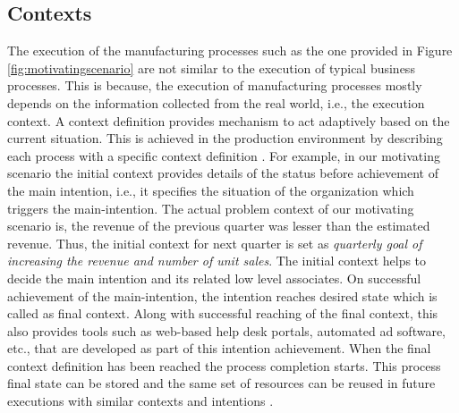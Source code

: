 \subsection{Contexts} 
\label{sec:contexts}
The execution of the manufacturing processes such as the one provided in Figure \ref{fig:motivatingscenario} are not similar to the execution of typical business processes. This is because, the execution of manufacturing processes mostly depends on the information collected from the real world, i.e., the execution context. A context definition provides mechanism to act adaptively based on the current situation. This is achieved in the production environment by describing each process with a specific context definition \cite{Sungur2016}. For example, in our motivating scenario the initial context provides details of the status before achievement of the main intention, i.e., it specifies the situation of the organization which triggers the main-intention. The actual problem context of our motivating scenario is, the revenue of the previous quarter was lesser than the estimated revenue. Thus, the initial context for next quarter is set as \textit{quarterly goal of increasing the revenue and number of unit sales}. The initial context helps to decide the main intention and its related low level associates. On successful achievement of the  main-intention, the intention reaches desired state which is called as final context. Along with successful reaching of the final context, this also provides tools such as web-based help desk portals, automated ad software, etc., that are developed as part of this intention achievement. When the final context definition has been reached the process completion starts. This process final state can be stored and the same set of resources can be reused in future executions with similar contexts and intentions \cite{Sungur2015}.
 
